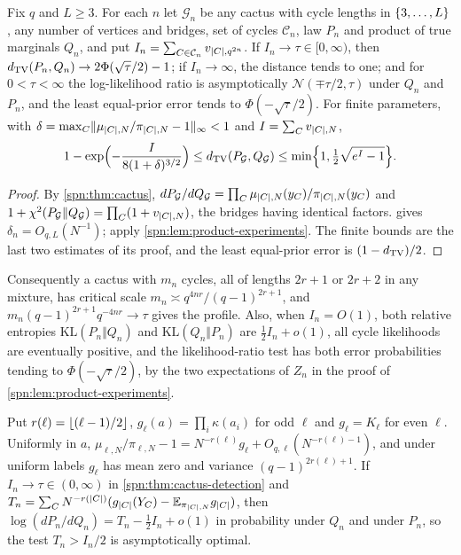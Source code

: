 \begin{theorem}\label{spn:thm:cactus-detection}
Fix $q$ and $L\ge3$. For each $n$ let $\mathcal G_n$ be any cactus with cycle lengths in
$\{3,\dots,L\}$, any number of vertices and bridges, set of cycles $\mathcal C_n$, law $P_n$ and
product of true marginals $Q_n$, and put $I_n=\sum_{C\in\mathcal C_n}v_{\lvert C\rvert,q^{2n}}$. If
$I_n\to\tau\in[0,\infty)$, then $d_{\mathrm{TV}}(P_n,Q_n)\to2\Phi(\sqrt\tau/2)-1$; if $I_n\to\infty$, the
distance tends to one; and for $0<\tau<\infty$ the log-likelihood ratio is asymptotically
$\mathcal N(\mp\tau/2,\tau)$ under $Q_n$ and $P_n$, and the least equal-prior error tends to
$\Phi(-\sqrt\tau/2)$. For finite parameters, with $\delta=\max_C\lVert\mu_{\lvert C\rvert,N}/\pi_{\lvert C\rvert,N}-1\rVert_\infty<1$
and $I=\sum_Cv_{\lvert C\rvert,N}$,
\begin{equation}\label{spn:eq:cactus-finite}
 1-\exp\Bigl(-\frac I{8(1+\delta)^{3/2}}\Bigr)\le d_{\mathrm{TV}}(P_{\mathcal G},Q_{\mathcal G})
 \le\min\Bigl\{1,\tfrac12\sqrt{e^I-1}\Bigr\}.
\end{equation}
\end{theorem}

\begin{proof}
By \cref{spn:thm:cactus},
$dP_{\mathcal G}/dQ_{\mathcal G}=\prod_C\mu_{\lvert C\rvert,N}(y_C)/\pi_{\lvert C\rvert,N}(y_C)$ and
$1+\chi^2(P_{\mathcal G}\Vert Q_{\mathcal G})=\prod_C(1+v_{\lvert C\rvert,N})$, the bridges having identical
factors.  gives $\delta_n=O_{q,L}(N^{-1})$; apply
\cref{spn:lem:product-experiments}. The finite bounds are the last two estimates of its proof, and
the least equal-prior error is $(1-d_{\mathrm{TV}})/2$.
\end{proof}

Consequently a cactus with $m_n$ cycles, all of lengths $2r+1$ or $2r+2$ in any mixture, has critical
scale $m_n\asymp q^{4nr}/(q-1)^{2r+1}$, and $m_n(q-1)^{2r+1}q^{-4nr}\to\tau$ gives the profile. Also,
when $I_n=O(1)$, both relative entropies $\mathrm{KL}(P_n\Vert Q_n)$ and $\mathrm{KL}(Q_n\Vert P_n)$ are
$\frac12I_n+o(1)$, all cycle likelihoods are eventually positive, and the likelihood-ratio test has
both error probabilities tending to $\Phi(-\sqrt\tau/2)$, by the two expectations of $Z_n$ in the
proof of \cref{spn:lem:product-experiments}.

\begin{proposition}\label{spn:prop:cactus-score}
Put $r(\ell)=\lfloor(\ell-1)/2\rfloor$, $g_\ell(a)=\prod_i\kappa(a_i)$ for odd $\ell$ and $g_\ell=K_\ell$ for
even $\ell$. Uniformly in $a$, $\mu_{\ell,N}/\pi_{\ell,N}-1=N^{-r(\ell)}g_\ell+O_{q,\ell}(N^{-r(\ell)-1})$,
and under uniform labels $g_\ell$ has mean zero and variance $(q-1)^{2r(\ell)+1}$. If $I_n\to\tau\in(0,\infty)$
in \cref{spn:thm:cactus-detection} and
$T_n=\sum_CN^{-r(\lvert C\rvert)}(g_{\lvert C\rvert}(Y_C)-\mathbb{E}_{\pi_{\lvert C\rvert,N}}g_{\lvert C\rvert})$, then
$\log(dP_n/dQ_n)=T_n-\frac12I_n+o(1)$ in probability under $Q_n$ and under $P_n$, so the test
$T_n>I_n/2$ is asymptotically optimal.
\end{proposition}

